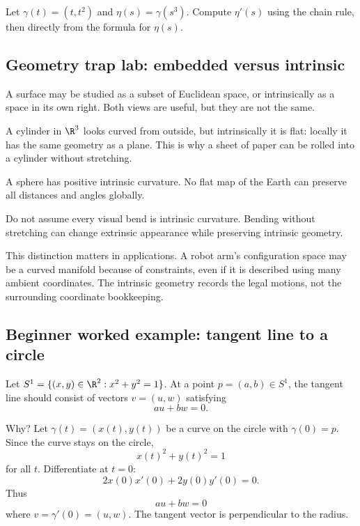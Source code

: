 \begin{labbox}
Let $\gamma(t)=(t,t^2)$ and $\eta(s)=\gamma(s^3)$. Compute $\eta'(s)$ using the
chain rule, then directly from the formula for $\eta(s)$.
\end{labbox}

\subsection{Geometry trap lab: embedded versus intrinsic}

A surface may be studied as a subset of Euclidean space, or intrinsically as a
space in its own right. Both views are useful, but they are not the same.

\begin{example}
A cylinder in $\R^3$ looks curved from outside, but intrinsically it is flat:
locally it has the same geometry as a plane. This is why a sheet of paper can
be rolled into a cylinder without stretching.
\end{example}

\begin{example}
A sphere has positive intrinsic curvature. No flat map of the Earth can preserve
all distances and angles globally.
\end{example}

\begin{trapbox}
Do not assume every visual bend is intrinsic curvature. Bending without
stretching can change extrinsic appearance while preserving intrinsic geometry.
\end{trapbox}

This distinction matters in applications. A robot arm's configuration space may
be a curved manifold because of constraints, even if it is described using many
ambient coordinates. The intrinsic geometry records the legal motions, not the
surrounding coordinate bookkeeping.

\subsection{Beginner worked example: tangent line to a circle}

Let $S^1=\{(x,y)\in\R^2:x^2+y^2=1\}$. At a point $p=(a,b)\in S^1$, the tangent
line should consist of vectors $v=(u,w)$ satisfying
\[
au+bw=0.
\]

Why? Let $\gamma(t)=(x(t),y(t))$ be a curve on the circle with $\gamma(0)=p$.
Since the curve stays on the circle,
\[
x(t)^2+y(t)^2=1
\]
for all $t$. Differentiate at $t=0$:
\[
2x(0)x'(0)+2y(0)y'(0)=0.
\]
Thus
\[
a u+b w=0
\]
where $v=\gamma'(0)=(u,w)$. The tangent vector is perpendicular to the radius.

